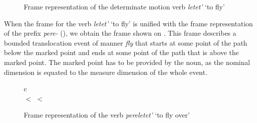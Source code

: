 \begin{figure}
\centering
{}
\caption{Frame representation of the determinate motion verb \textit{letet'} `to fly' \label{frame:letet}}
\end{figure}

When the frame for the verb \textit{letet'} `to fly' is unified with the frame representation of the prefix \textit{pere-} (), we obtain the frame shown on . This frame describes a bounded translocation event of manner \textit{fly} that starts at some point of the path below the marked point and ends at some point of the path that is above the marked point. The marked point has to be provided by the noun, as the nominal dimension is equated to the measure dimension of the whole event. 

\begin{figure}
\begin{center}
\begin{tabular}{c}
\\
 $<$  $<$ 
\end{tabular}
\end{center}
\caption{Frame representation of the verb \textit{pereletet'} `to fly over' \label{frame:pere:letet}}
\end{figure}

